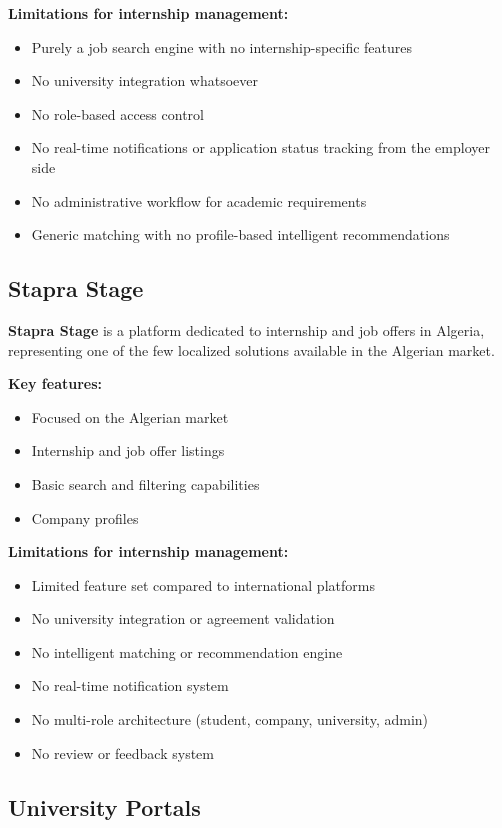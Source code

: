 \textbf{Limitations for internship management:}
\begin{itemize}
    \item Purely a job search engine with no internship-specific features
    \item No university integration whatsoever
    \item No role-based access control
    \item No real-time notifications or application status tracking from the employer side
    \item No administrative workflow for academic requirements
    \item Generic matching with no profile-based intelligent recommendations
\end{itemize}

\subsection{Stapra Stage}

\textbf{Stapra Stage} is a platform dedicated to internship and job offers in Algeria, representing one of the few localized solutions available in the Algerian market.

\textbf{Key features:}
\begin{itemize}
    \item Focused on the Algerian market
    \item Internship and job offer listings
    \item Basic search and filtering capabilities
    \item Company profiles
\end{itemize}

\textbf{Limitations for internship management:}
\begin{itemize}
    \item Limited feature set compared to international platforms
    \item No university integration or agreement validation
    \item No intelligent matching or recommendation engine
    \item No real-time notification system
    \item No multi-role architecture (student, company, university, admin)
    \item No review or feedback system
\end{itemize}

\subsection{University Portals}

